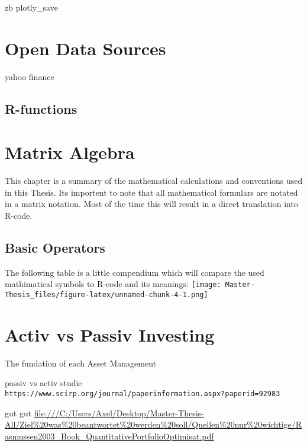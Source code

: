 \documentclass[
  oneside]{book}
\newenvironment{Shaded}{\begin{snugshade}}{\end{snugshade}}
\newcommand{\AttributeTok}[1]{\textcolor[rgb]{0.77,0.63,0.00}{#1}}
\newcommand{\FunctionTok}[1]{\textcolor[rgb]{0.00,0.00,0.00}{#1}}
\newcommand{\NormalTok}[1]{#1}
\newcommand{\SpecialCharTok}[1]{\textcolor[rgb]{0.00,0.00,0.00}{#1}}
\newcommand{\StringTok}[1]{\textcolor[rgb]{0.31,0.60,0.02}{#1}}
\begin{document}
zb plotly\_save

\hypertarget{open-data-sources}{%
\chapter{Open Data Sources}\label{open-data-sources}}

yahoo finance

\hypertarget{r-functions-1}{%
\section{R-functions}\label{r-functions-1}}

\hypertarget{matrix-algebra}{%
\chapter{Matrix Algebra}\label{matrix-algebra}}

This chapter is a summary of the mathematical calculations and conventions used in this Thesis. Its importent to note that all mathematical formulars are notated in a matrix notation. Most of the time this will result in a direct translation into R-code.

\hypertarget{basic-operators}{%
\section{Basic Operators}\label{basic-operators}}

The following table is a little compendium which will compare the used mathimatical symbols to R-code and its meanings:
\texttt{[image: Master-Thesis\_files/figure-latex/unnamed-chunk-4-1.png]}

\hypertarget{activ-vs-passiv-investing}{%
\chapter{Activ vs Passiv Investing}\label{activ-vs-passiv-investing}}

The fundation of each Asset Management

passiv vs activ studie
\texttt{https://www.scirp.org/journal/paperinformation.aspx?paperid=92983}

gut gut
\url{file:///C:/Users/Axel/Desktop/Master-Thesis-All/Ziel\%20was\%20beantwortet\%20werden\%20soll/Quellen\%20nur\%20wichtige/Rasmussen2003_Book_QuantitativePortfolioOptimisat.pdf}

\begin{Shaded}
\end{Shaded}
\end{document}
